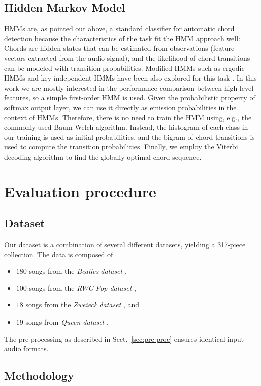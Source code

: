 \documentclass{article}
\begin{document}
\subsection{Hidden Markov Model}
HMMs are, as pointed out above, a standard classifier for automatic chord detection because the characteristics of the task fit the HMM approach well: Chords are hidden states that can be estimated from observations (feature vectors extracted from the audio signal), and the likelihood of chord transitions can be modeled with transition probabilities. 
Modified HMMs such as ergodic HMMs and key-independent HMMs have been also explored for this task \cite{papadopoulos2007large,lee2008acoustic}. In this work we are mostly interested in the performance comparison between high-level features, so a simple first-order HMM is used. 
Given the probabilistic property of softmax output layer, we can use it directly as emission probabilities in the context of HMMs. Therefore, there is no need to train the HMM using, e.g., the commonly used Baum-Welch algorithm. Instead, the histogram of each class in our training is used as initial probabilities, and the bigram of chord transitions is used to compute the transition probabilities. Finally, we employ the Viterbi decoding algorithm to find the globally optimal chord sequence. 

\section{Evaluation procedure}
\subsection{Dataset}
Our dataset is a combination of several different datasets, yielding a 317-piece collection. The data is composed of 
\begin{itemize}
	\item   $180$ songs from the \textit{Beatles dataset} \cite{mauch2009omras2},
    \item   $100$ songs from the \textit{RWC Pop dataset} \cite{goto2002rwc}, 
    \item   $18$ songs from the \textit{Zweieck dataset} \cite{mauch2009omras2}, and 
    \item   $19$ songs from \textit{Queen dataset} \cite{mauch2009omras2}.
\end{itemize}  
The pre-processing as described in Sect.~\ref{sec:pre-proc} ensures identical input audio formats.

\subsection{Methodology}
\end{document}
